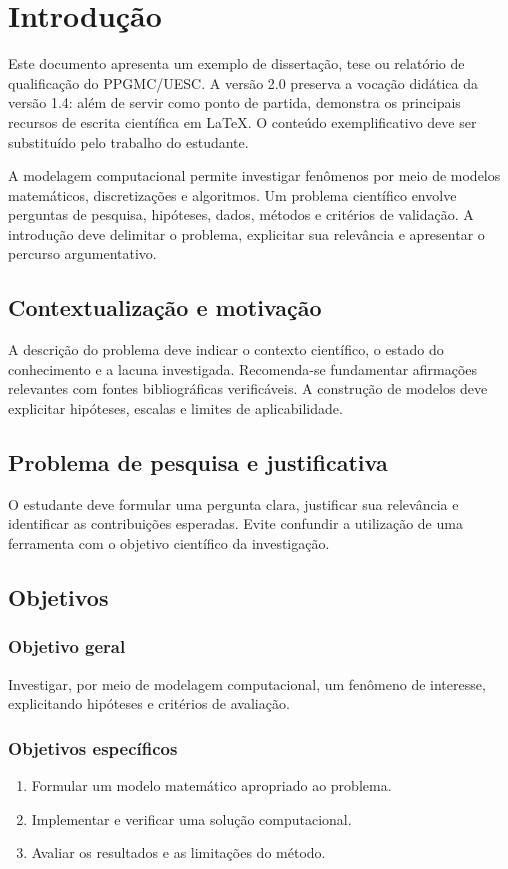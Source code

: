 \chapter{Introdução}\label{chap:introducao}
Este documento apresenta um exemplo de dissertação, tese ou relatório de qualificação do PPGMC/UESC. A versão 2.0 preserva a vocação didática da versão 1.4: além de servir como ponto de partida, demonstra os principais recursos de escrita científica em \LaTeX. O conteúdo exemplificativo deve ser substituído pelo trabalho do estudante.

A modelagem computacional permite investigar fenômenos por meio de modelos matemáticos, discretizações e algoritmos. Um problema científico envolve perguntas de pesquisa, hipóteses, dados, métodos e critérios de validação. A introdução deve delimitar o problema, explicitar sua relevância e apresentar o percurso argumentativo.

\section{Contextualização e motivação}
A descrição do problema deve indicar o contexto científico, o estado do conhecimento e a lacuna investigada. Recomenda-se fundamentar afirmações relevantes com fontes bibliográficas verificáveis. A construção de modelos deve explicitar hipóteses, escalas e limites de aplicabilidade.

\section{Problema de pesquisa e justificativa}
O estudante deve formular uma pergunta clara, justificar sua relevância e identificar as contribuições esperadas. Evite confundir a utilização de uma ferramenta com o objetivo científico da investigação.

\section{Objetivos}
\subsection{Objetivo geral}
Investigar, por meio de modelagem computacional, um fenômeno de interesse, explicitando hipóteses e critérios de avaliação.
\subsection{Objetivos específicos}
\begin{enumerate}[label=\alph*)]
\item Formular um modelo matemático apropriado ao problema.
\item Implementar e verificar uma solução computacional.
\item Avaliar os resultados e as limitações do método.
\end{enumerate}

